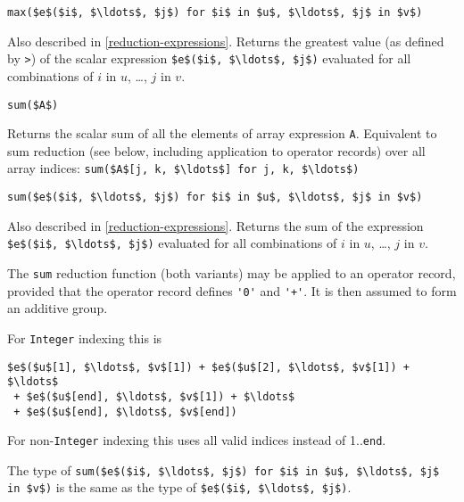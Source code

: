 \begin{operatordefinition*}[max]\label{modelica:max-reduction}
\begin{synopsis}\begin{lstlisting}
max($e$($i$, $\ldots$, $j$) for $i$ in $u$, $\ldots$, $j$ in $v$)
\end{lstlisting}\end{synopsis}
\begin{semantics}
Also described in \cref{reduction-expressions}.  Returns the greatest value (as defined by \lstinline!>!) of the scalar expression \lstinline!$e$($i$, $\ldots$, $j$)! evaluated for all combinations of $i$ in $u$, \ldots, $j$ in $v$.
\end{semantics}
\end{operatordefinition*}

\begin{operatordefinition*}[sum]\label{modelica:sum-of-array}
\begin{synopsis}\begin{lstlisting}
sum($A$)
\end{lstlisting}\end{synopsis}
\begin{semantics}
Returns the scalar sum of all the elements of array expression \lstinline!A!.  Equivalent to sum reduction (see below, including application to operator records) over all array indices: \lstinline!sum($A$[j, k, $\ldots$] for j, k, $\ldots$)!
\end{semantics}
\end{operatordefinition*}

\begin{operatordefinition*}[sum]\label{modelica:sum-reduction}
\begin{synopsis}\begin{lstlisting}
sum($e$($i$, $\ldots$, $j$) for $i$ in $u$, $\ldots$, $j$ in $v$)
\end{lstlisting}\end{synopsis}
\begin{semantics}
Also described in \cref{reduction-expressions}.  Returns the sum of the expression \lstinline!$e$($i$, $\ldots$, $j$)! evaluated for all combinations of $i$ in $u$, \ldots, $j$ in $v$.

The \lstinline!sum! reduction function (both variants) may be applied to an operator record, provided that the operator record defines \lstinline!'0'! and \lstinline!'+'!.
It is then assumed to form an additive group.

For \lstinline!Integer! indexing this is
\begin{lstlisting}[language=modelica]
$e$($u$[1], $\ldots$, $v$[1]) + $e$($u$[2], $\ldots$, $v$[1]) + $\ldots$
 + $e$($u$[end], $\ldots$, $v$[1]) + $\ldots$
 + $e$($u$[end], $\ldots$, $v$[end])
\end{lstlisting}
For non-\lstinline!Integer! indexing this uses all valid indices instead of 1..\lstinline!end!.

The type of \lstinline!sum($e$($i$, $\ldots$, $j$) for $i$ in $u$, $\ldots$, $j$ in $v$)! is the same as the type of \lstinline!$e$($i$, $\ldots$, $j$)!.
\end{semantics}
\end{operatordefinition*}


